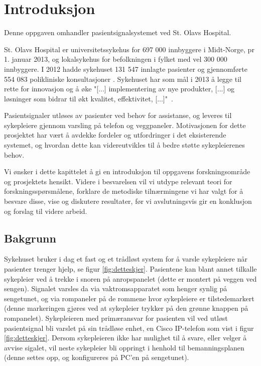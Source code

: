 \chapter{Introduksjon}
\label{chp:introduksjon}
Denne oppgaven omhandler pasientsignalsystemet ved St. Olavs Hospital.

\noindent
St. Olavs Hospital er universitetssykehus for 697 000 innbyggere i Midt-Norge, pr 1. januar 2013, og lokalsykehus for befolkningen i fylket med vel 300 000 innbyggere. I 2012 hadde sykehuset 131 547 innlagte pasienter og gjennomførte 554 083 polikliniske konsultasjoner \cite{stolavs}. Sykehuset har som mål i 2013 å legge til rette for innovasjon og å øke "[...] implementering av nye produkter, [...] og løsninger som bidrar til økt kvalitet, effektivitet, [...]"\ \cite{styring13}.

\noindent
Pasientsignaler utløses av pasienter ved behov for assistanse, og leveres til sykepleiere gjennom varsling på telefon og veggpaneler. Motivasjonen for dette prosjektet har vært å avdekke fordeler og utfordringer i det eksisterende systemet, og hvordan dette kan videreutvikles til å bedre støtte sykepleierenes behov.

\noindent
Vi ønsker i dette kapittelet å gi en introduksjon til oppgavens forskningsområde og prosjektets hensikt. Videre i besvarelsen vil vi utdype relevant teori for forskningsspørsmålene, forklare de metodiske tilnærmingene vi har valgt for å besvare disse, vise og diskutere resultater, før vi avslutningsvis gir en konklusjon og forslag til videre arbeid.

\section{Bakgrunn}
Sykehuset bruker i dag et fast og et trådløst system for å varsle sykepleiere når pasienter trenger hjelp, se figur \ref{fig:detteskjer}. Pasientene kan blant annet tilkalle sykepleier ved å trekke i snoren på anropspanelet (dette er montert på veggen ved sengen). Signalet varsles da via vaktromsapparatet som henger synlig på sengetunet, og via rompaneler på de rommene hvor sykepleiere er tilstedemarkert (denne markeringen gjøres ved at sykepleier trykker på den grønne knappen på rompanelet). 
Sykepleieren med primæransvar for pasienten vil ved utløst pasientsignal bli varslet på sin trådløse enhet, en Cisco IP-telefon som vist i figur \ref{fig:detteskjer}. Dersom sykepleieren ikke har mulighet til å svare, eller velger å avvise sigalet, vil neste sykepleier bli oppringt i henhold til bemanningsplanen (denne settes opp, og konfigureres på PC'en på sengetunet).

